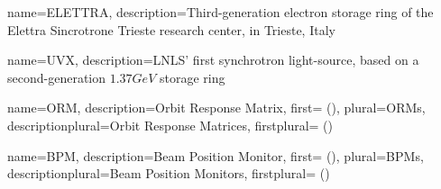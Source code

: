 {
  name={ELETTRA},
  description={Third-generation electron storage ring of the Elettra Sincrotrone Trieste research center, in Trieste, Italy}
}



{
  name={UVX},
  description={LNLS' first synchrotron light-source, based on a second-generation $1.37\unit{G eV}$ storage ring}
}

{
  name={ORM},
  description={Orbit Response Matrix},
  first={ ()},
  plural={ORMs},
  descriptionplural={Orbit Response Matrices},
  firstplural={ ()}
}

{
  name={BPM},
  description={Beam Position Monitor},
  first={ ()},
  plural={BPMs},
  descriptionplural={Beam Position Monitors},
  firstplural={ ()}
}


